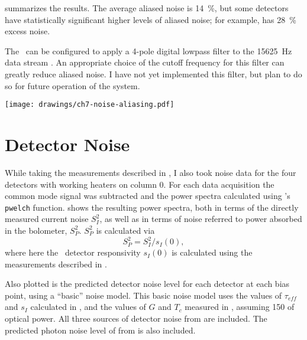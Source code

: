  summarizes the results.
The average aliased noise is \SI{14}{\percent}, but some detectors have statistically significant higher levels of aliased noise; for example,  has \SI{28}{\percent} excess noise.

The \MCE\ can be configured to apply a 4-pole digital lowpass filter to the \SI{15625}{\Hz} data stream \cite{mce_team_digital_????}.
An appropriate choice of the cutoff frequency for this filter can greatly reduce aliased noise.
I have not yet implemented this filter, but plan to do so for future operation of the system.

\begin{figure*}
  \centering
\texttt{[image: drawings/ch7-noise-aliasing.pdf]}
\caption[Plots showing impact of noise aliasing]{
Plots showing impact of noise aliasing.
\textbf{Left}
Plot showing fractional excess noise (see text for definition) due to noise aliasing for all rows of column 0.
The error bars are for \SI{95}{\percent} confidence intervals, and the average excess noise is \SI{14}{\percent}.
\textbf{Right}
Sample power spectra at \SI{3125}{\hertz} and \SI{15625}{\hertz} for .
For this detector the excess noise is \SI{17}{\percent}.
}
\label{fig:ch7-noise-aliasing}
\end{figure*}

\section{Detector Noise} \label{sec:det-noise}

While taking the measurements described in , I also took noise data for the four detectors with working heaters on column 0.
For each data acquisition the common mode signal was subtracted and the power spectra calculated using \MATLAB's \texttt{pwelch} function.
 shows the resulting power spectra, both in terms of the directly measured current noise $S^2_I$, as well as in terms of noise referred to power absorbed in the bolometer, $S^2_{P}$.
$S^2_{P}$ is calculated via
\begin{equation}
 S^2_{P} = S^2_I / s_I(0),
\end{equation}
where here the \DC\ detector responsivity $s_I(0)$ is calculated using the measurements described in .

Also plotted is the predicted detector noise level for each detector at each bias point, using a ``basic'' noise model.
This basic noise model uses the values of $\tau_{eff}$ and $s_I$ calculated in , and the values of $G$ and $T_c$ measured in , assuming \SI{150}{\pW} of optical power.
All three sources of detector noise from  are included.
The predicted photon noise level of  from  is also included.

